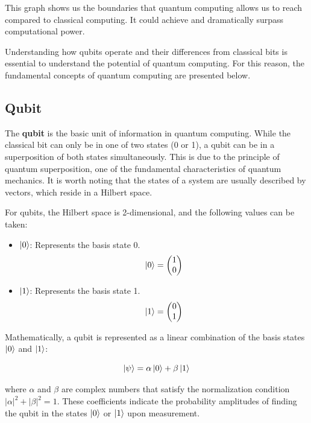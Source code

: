 This graph shows us the boundaries that quantum computing allows us to reach compared to classical computing. It could achieve and dramatically surpass computational power.

Understanding how qubits operate and their differences from classical bits is essential to understand the potential of quantum computing. For this reason, the fundamental concepts of quantum computing are presented below.


\subsection{Qubit}

The \textbf{qubit} is the basic unit of information in quantum computing. While the classical bit can only be in one of two states (0 or 1), a qubit can be in a superposition of both states simultaneously. This is due to the principle of quantum superposition, one of the fundamental characteristics of quantum mechanics. It is worth noting that the states of a system are usually described by vectors, which reside in a Hilbert space.

For qubits, the Hilbert space is 2-dimensional, and the following values can be taken:

\begin{itemize}
    \item \(\ket{0}\): Represents the basis state 0.
    \[
    \ket{0} = \begin{pmatrix} 1 \\ 0 \end{pmatrix}
    \]

    \item \(\ket{1}\): Represents the basis state 1.
    \[
    \ket{1} = \begin{pmatrix} 0 \\ 1 \end{pmatrix}
    \]
\end{itemize}

Mathematically, a qubit is represented as a linear combination of the basis states $\ket{0}$ and $\ket{1}$:

\[
\ket{\psi} = \alpha\ket{0} + \beta\ket{1}
\]

where $\alpha$ and $\beta$ are complex numbers that satisfy the normalization condition $|\alpha|^2 + |\beta|^2 = 1$. These coefficients indicate the probability amplitudes of finding the qubit in the states $\ket{0}$ or $\ket{1}$ upon measurement.\cite{wikipedia_qubit}


